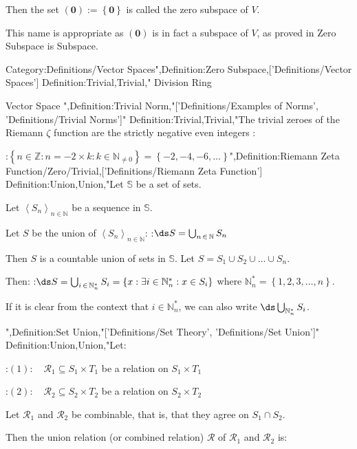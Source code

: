 Then the set $(\mathbf 0) := \left\{{\mathbf 0}\right\}$ is called the zero subspace of $V$.


This name is appropriate as $(\mathbf 0)$ is in fact a subspace of $V$, as proved in Zero Subspace is Subspace.




Category:Definitions/Vector Spaces",Definition:Zero Subspace,['Definitions/Vector Spaces']
Definition:Trivial,Trivial," Division Ring 


 Vector Space 
",Definition:Trivial Norm,"['Definitions/Examples of Norms', 'Definitions/Trivial Norms']"
Definition:Trivial,Trivial,"The trivial zeroes of the Riemann $\zeta$ function are the strictly negative even integers :

:$\left\lbrace n \in \mathbb Z: n = -2 \times k: k \in \mathbb N_{\ne 0}  \right\rbrace = \left\lbrace -2, -4, -6, \ldots \right\rbrace$",Definition:Riemann Zeta Function/Zero/Trivial,['Definitions/Riemann Zeta Function']
Definition:Union,Union,"Let $\mathbb S$ be a set of sets.

Let $\left\langle S_n \right\rangle_{n \mathop \in \mathbb N}$ be a sequence in $\mathbb S$.

Let $S$ be the union of $\left\langle S_n \right\rangle_{n \mathop \in \mathbb N}$:
:$\ds S = \bigcup_{n \mathop \in \mathbb N} S_n$


Then $S$ is a countable union of sets in $\mathbb S$.
Let $S = S_1 \cup S_2 \cup \ldots \cup S_n$.

Then:
:$\ds S = \bigcup_{i \mathop \in \mathbb N^*_n} S_i = \left\lbrace x: \exists i \in \mathbb N^*_n: x \in S_i \right\rbrace$
where $\mathbb N^*_n = \left\lbrace 1, 2, 3, \ldots, n \right\rbrace$.


If it is clear from the context that $i \in \mathbb N^*_n$, we can also write $\ds \bigcup_{\mathbb N^*_n} S_i$.



",Definition:Set Union,"['Definitions/Set Theory', 'Definitions/Set Union']"
Definition:Union,Union,"Let:

:$(1): \quad \mathcal R_1 \subseteq S_1 \times T_1$ be a relation on $S_1 \times T_1$

:$(2): \quad \mathcal R_2 \subseteq S_2 \times T_2$ be a relation on $S_2 \times T_2$

Let $\mathcal R_1$ and $\mathcal R_2$ be combinable, that is, that they agree on $S_1 \cap S_2$.


Then the union relation (or combined relation) $\mathcal R$ of $\mathcal R_1$ and $\mathcal R_2$ is:

